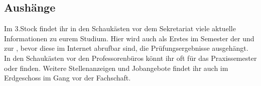 \subsection{Aushänge}
Im 3.Stock findet ihr in den Schaukästen vor dem Sekretariat viele 
aktuelle Informationen zu eurem Studium. Hier wird auch als Erstes im 
Semester der  und zur , bevor diese 
im Internet abrufbar sind, die Prüfungsergebnisse ausgehängt. In den 
Schaukästen vor den Professorenbüros könnt ihr oft  
für das Praxissemester oder  finden. 
Weitere Stellenanzeigen und Jobangebote findet ihr auch im 
Erdgeschoss im Gang vor der Fachschaft. 